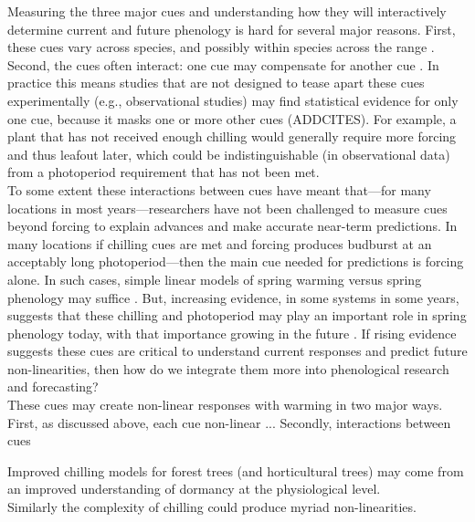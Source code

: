
Measuring the three major cues and understanding how they will interactively determine current and future phenology is hard for several major reasons. First, these cues vary across species, and possibly within species across the range  \citep{vitasse2009,harrington2015}. Second, the cues often interact: one cue may compensate for another cue \citep{Chuine2000}. In practice this means studies that are not designed to tease apart these cues experimentally (e.g., observational studies) may find statistical evidence for only one cue, because it masks one or more other cues (ADDCITES). For example, a plant that has not received enough chilling would generally require more forcing and thus leafout later, which could be indistinguishable (in observational data) from a photoperiod requirement that has not been met. \\

To some extent these interactions between cues have meant that---for many locations in most years---researchers have not been challenged to measure cues beyond forcing to explain advances and make accurate near-term predictions. In many locations if chilling cues are met and forcing produces budburst at an acceptably long photoperiod---then the main cue needed for predictions is forcing alone. In such cases, simple linear models of spring warming versus spring phenology may suffice \citep[e.g.,]{Ellwood2012}. But, increasing evidence, in some systems in some years, suggests that these chilling and photoperiod may play an important role in spring phenology today, with that importance growing in the future \citep{chuine2016,gauzere2019}. If rising evidence suggests these cues are critical to understand current responses and predict future non-linearities, then how do we integrate them more into phenological research and forecasting? \\%

These cues may create non-linear responses with warming in two major ways. First, as discussed above, each cue non-linear ... Secondly, interactions between cues


Improved chilling models for forest trees (and horticultural trees) may come from an improved understanding of dormancy at the physiological level. \\ %

Similarly the complexity of chilling could produce myriad non-linearities.  
